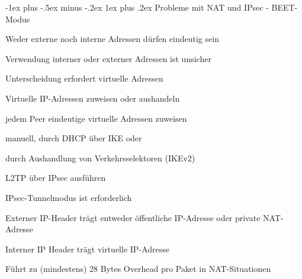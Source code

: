 \documentclass[a4paper]{article}
\makeatletter
\renewcommand{\subsubsection}{\@startsection{subsubsection}{3}{0mm}%
 {-1ex plus -.5ex minus -.2ex}%
 {1ex plus .2ex}%
 {\normalfont\small\bfseries}}
\makeatother
\begin{document}
\begin{multicols}{3}
      \subsubsection{Probleme mit NAT und IPsec - BEET-Modus}
      \begin{itemize*}
            \item Weder externe noch interne Adressen dürfen eindeutig sein
            \begin{itemize*}
                  \item Verwendung interner oder externer Adressen ist unsicher
                  \item Unterscheidung erfordert virtuelle Adressen
            \end{itemize*}
            \item Virtuelle IP-Adressen zuweisen oder aushandeln
            \begin{itemize*}
                  \item jedem Peer eindeutige virtuelle Adressen zuweisen
                  \item manuell, durch DHCP über IKE oder
                  \item durch Aushandlung von Verkehrsselektoren (IKEv2)
                  \item L2TP über IPsec ausführen
            \end{itemize*}
            \item IPsec-Tunnelmodus ist erforderlich
            \begin{itemize*}
                  \item Externer IP-Header trägt entweder öffentliche IP-Adresse oder private NAT-Adresse
                  \item Interner IP Header trägt virtuelle IP-Adresse
                  \item Führt zu (mindestens) 28 Bytes Overhead pro Paket in NAT-Situationen
            \end{itemize*}

\end{itemize*}
\end{multicols}
\end{document}
